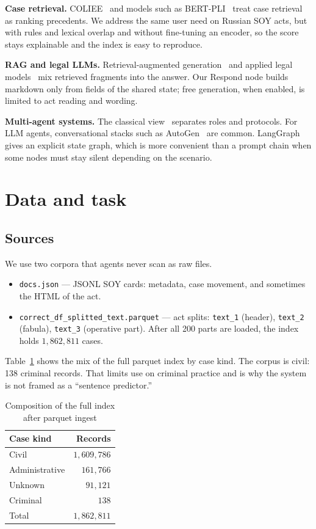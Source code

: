 \documentclass[preprint,12pt]{elsarticle}
\begin{document}
\textbf{Case retrieval.} COLIEE~\cite{rabelo2022coliee} and models such as BERT-PLI~\cite{shao2020bertpli} treat case retrieval as ranking precedents. We address the same user need on Russian SOY acts, but with rules and lexical overlap and without fine-tuning an encoder, so the score stays explainable and the index is easy to reproduce.

\textbf{RAG and legal LLMs.} Retrieval-augmented generation~\cite{lewis2020rag} and applied legal models~\cite{cui2023survey} mix retrieved fragments into the answer. Our Respond node builds markdown only from fields of the shared state; free generation, when enabled, is limited to act reading and wording.

\textbf{Multi-agent systems.} The classical view~\cite{wooldridge2009mas} separates roles and protocols. For LLM agents, conversational stacks such as AutoGen~\cite{wu2023autogen} are common. LangGraph~\cite{langgraph2024} gives an explicit state graph, which is more convenient than a prompt chain when some nodes must stay silent depending on the scenario.

\section{Data and task}

\subsection{Sources}

We use two corpora that agents never scan as raw files.

\begin{itemize}
\item \texttt{docs.json} --- JSONL SOY cards: metadata, case movement, and sometimes the HTML of the act.
\item \texttt{correct\_df\_splitted\_text.parquet} --- act splits: \texttt{text\_1} (header), \texttt{text\_2} (fabula), \texttt{text\_3} (operative part). After all 200 parts are loaded, the index holds $1{,}862{,}811$ cases.
\end{itemize}

Table~\ref{tab:kinds} shows the mix of the full parquet index by case kind. The corpus is civil: 138 criminal records. That limits use on criminal practice and is why the system is not framed as a ``sentence predictor.''

\begin{table}[t]
\centering
\caption{Composition of the full index after parquet ingest}
\label{tab:kinds}
\begin{tabular}{lr}
\toprule
Case kind & Records \\
\midrule
Civil & $1{,}609{,}786$ \\
Administrative & $161{,}766$ \\
Unknown & $91{,}121$ \\
Criminal & $138$ \\
\midrule
Total & $1{,}862{,}811$ \\
\bottomrule
\end{tabular}
\end{table}
\end{document}
